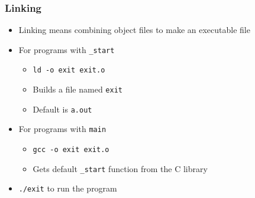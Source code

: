\documentclass{beamer}
\begin{document}
\begin{frame}
    \frametitle{Linking}
    \begin{itemize}
        \item Linking means combining object files to make an executable file
        \item For programs with {\tt \_start}
        \begin{itemize}
            \item {\tt ld -o exit exit.o}
            \item Builds a file named {\tt exit}
            \item Default is {\tt a.out}
        \end{itemize}
        \item For programs with {\tt main}
        \begin{itemize}
            \item {\tt gcc -o exit exit.o}
            \item Gets default {\tt \_start} function from the C library
        \end{itemize}
        \item {\tt ./exit} to run the program
    \end{itemize}
\end{frame}
\end{document}
